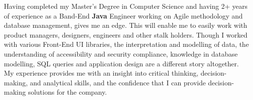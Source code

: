 Having completed my Master’s Degree in Computer Science and having 2+ years of experience as a Band-End \textbf{Java} {Engineer} working on Agile methodology and database management, gives me an edge. 
This will enable me to easily work with product managers, designers, engineers and other stalk holders.
{Though I worked with various Front-End UI libraries, the interpretation and modelling of data, the understanding of accessibility and security compliance, knowledge in database modelling, SQL queries and application design are a different story altogether.}
My experience provides me with an insight into critical thinking, decision-making, and analytical skills, and the confidence that I can provide decision-making solutions for the company.
